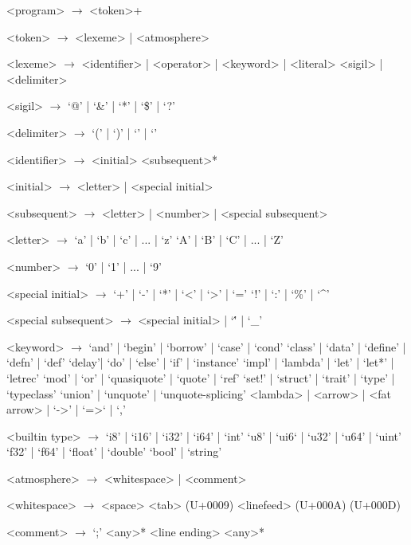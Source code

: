     \begin{grammar}
        <program> $\to$ <token>+

        <token> $\to$ <lexeme> | <atmosphere>

        <lexeme> $\to$ <identifier> | <operator> | <keyword> | <literal>
                    \alt <sigil> | <delimiter>

        <sigil> $\to$ `@' | `&' | `*' | `\$' | `?'

        <delimiter> $\to$ `(' | `)' | `{' | `}'

        <identifier> $\to$ <initial> <subsequent>*

        <initial> $\to$ <letter> | <special initial>

        <subsequent> $\to$ <letter> | <number> | <special subsequent>

        <letter> $\to$ `a' | `b' | `c' | ... | `z'
                 \alt `A' | `B' | `C' | ... | `Z'

        <number> $\to$ `0' | `1' | ... | `9'

        <special initial> $\to$ `+' | `-' | `*' | `<' | `>' | `='
                          \alt `!' | `:' | `\%' | `^'

        <special subsequent> $\to$ <special initial> | `\'' | `_'

        <keyword> $\to$ `and' | `begin'  | `borrow' | `case' | `cond'
                  \alt `class' | `data' | `define' | `defn' | `def'
                  \alt `delay'| `do' | `else' | `if' | `instance'
                  \alt `impl' | `lambda' | `let' | `let*' | `letrec'
                  \alt `mod' | `or' | `quasiquote' | `quote' | `ref'
                  \alt `set!' | `struct' | `trait' | `type' | `typeclass'
                  \alt `union' |  `unquote' | `unquote-splicing'
                  \alt <lambda> | <arrow> | <fat arrow>
                  \alt \lit{|}  | `->' | `=>` | `,'

        <builtin type> $\to$ `i8' | `i16' | `i32' | `i64' | `int'
                        \alt `u8' | `ui6` | `u32' | `u64' | `uint'
                        \alt `f32' | `f64' | `float' | `double'
                        \alt `bool' | `string'

        <atmosphere> $\to$ <whitespace> | <comment>

        <whitespace> $\to$ <space>
                    \alt <tab> (U+0009)
                    \alt <linefeed> (U+000A)
                     (U+000D)

        <comment> $\to$ `;' <any>* <line ending>
                  \alt \lit{\#|} <any>* \lit{|\#}

    \end{grammar}
